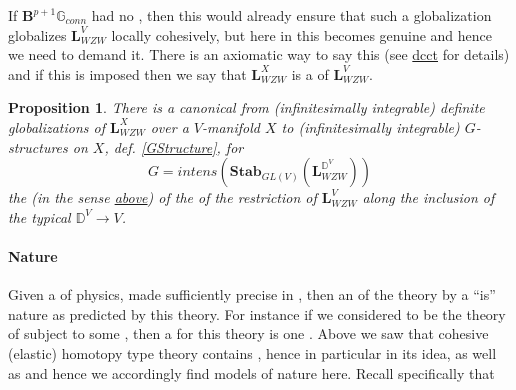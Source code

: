 \documentclass[12pt,titlepage]{article}
\theoremstyle{plain}
\newtheorem{prop}{Proposition}
\theoremstyle{definition}
\theoremstyle{remark}
\begin{document}
If $\mathbf{B}^{p+1}\mathbb{G}_{conn}$ had no , then this would already ensure that such a globalization globalizes $\mathbf{L}_{WZW}^V$ locally cohesively, but here in  this  becomes genuine  and hence we need to demand it. There is an axiomatic way to say this (see \hyperlink{dcct}{dcct} for details) and if this is imposed then we say that $\mathbf{L}_{WZW}^X$ is a  of $\mathbf{L}_{WZW}^V$.
\begin{prop}
\label{DefiniteGlobalizationsToGStructure}\hypertarget{DefiniteGlobalizationsToGStructure}{}
There is a canonical  from (infinitesimally integrable) definite globalizations of $\mathbf{L}_{WZW}^X$ over a $V$-manifold $X$ to (infinitesimally integrable) $G$-structures on $X$, def. \ref{GStructure}, for
\begin{displaymath}
G = intens(\mathbf{Stab}_{GL(V)}(\mathbf{L}_{WZW}^{\mathbb{D}^V}))
\end{displaymath}
the  (in the sense \hyperlink{IntensiveExtensive}{above}) of the  of the restriction of $\mathbf{L}_{WZW}^V$ along the inclusion of the typical  $\mathbb{D}^V \to V$.
\end{prop}
\hypertarget{nature}{}\paragraph*{{Nature}}\label{nature}
Given a  of physics, made sufficiently precise in , then an  of the theory by a  ``is'' nature as predicted by this theory.
For instance if we considered  to be the theory of  subject to some , then a  for this theory is one  .
Above we saw that cohesive (elastic) homotopy type theory contains , hence in particular  in its idea, as well as  and hence we accordingly find models of nature here.
Recall specifically that
\end{document}
